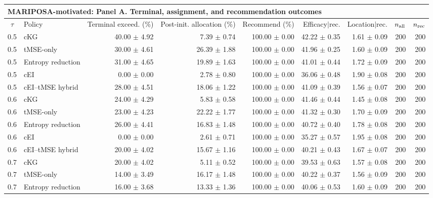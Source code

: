 \bigskip

\begin{tabular}{@{}clrrrrrrr@{}}
\multicolumn{9}{l}{\textbf{MARIPOSA-motivated: Panel A. Terminal, assignment, and recommendation outcomes}} \\
\toprule
$\tau$ & Policy & Terminal exceed. (\%) & Post-init. allocation (\%) & Recommend (\%) & Efficacy$\mid$rec. & Location$\mid$rec. & $n_{\rm all}$ & $n_{\rm rec}$ \\
\midrule
0.5 & cKG & 40.00 $\pm$ 4.92 & 7.39 $\pm$ 0.74 & 100.00 $\pm$ 0.00 & 42.22 $\pm$ 0.35 & 1.61 $\pm$ 0.09 & 200 & 200 \\
0.5 & tMSE-only & 30.00 $\pm$ 4.61 & 26.39 $\pm$ 1.88 & 100.00 $\pm$ 0.00 & 41.96 $\pm$ 0.25 & 1.60 $\pm$ 0.09 & 200 & 200 \\
0.5 & Entropy reduction & 31.00 $\pm$ 4.65 & 19.89 $\pm$ 1.63 & 100.00 $\pm$ 0.00 & 41.01 $\pm$ 0.44 & 1.72 $\pm$ 0.09 & 200 & 200 \\
0.5 & cEI & 0.00 $\pm$ 0.00 & 2.78 $\pm$ 0.80 & 100.00 $\pm$ 0.00 & 36.06 $\pm$ 0.48 & 1.90 $\pm$ 0.08 & 200 & 200 \\
0.5 & cEI--tMSE hybrid & 28.00 $\pm$ 4.51 & 18.06 $\pm$ 1.22 & 100.00 $\pm$ 0.00 & 41.09 $\pm$ 0.39 & 1.56 $\pm$ 0.07 & 200 & 200 \\
0.6 & cKG & 24.00 $\pm$ 4.29 & 5.83 $\pm$ 0.58 & 100.00 $\pm$ 0.00 & 41.46 $\pm$ 0.44 & 1.45 $\pm$ 0.08 & 200 & 200 \\
0.6 & tMSE-only & 23.00 $\pm$ 4.23 & 22.22 $\pm$ 1.77 & 100.00 $\pm$ 0.00 & 41.32 $\pm$ 0.30 & 1.70 $\pm$ 0.09 & 200 & 200 \\
0.6 & Entropy reduction & 26.00 $\pm$ 4.41 & 16.83 $\pm$ 1.48 & 100.00 $\pm$ 0.00 & 40.72 $\pm$ 0.40 & 1.78 $\pm$ 0.08 & 200 & 200 \\
0.6 & cEI & 0.00 $\pm$ 0.00 & 2.61 $\pm$ 0.71 & 100.00 $\pm$ 0.00 & 35.27 $\pm$ 0.57 & 1.95 $\pm$ 0.08 & 200 & 200 \\
0.6 & cEI--tMSE hybrid & 20.00 $\pm$ 4.02 & 15.67 $\pm$ 1.16 & 100.00 $\pm$ 0.00 & 40.21 $\pm$ 0.43 & 1.67 $\pm$ 0.07 & 200 & 200 \\
0.7 & cKG & 20.00 $\pm$ 4.02 & 5.11 $\pm$ 0.52 & 100.00 $\pm$ 0.00 & 39.53 $\pm$ 0.63 & 1.57 $\pm$ 0.08 & 200 & 200 \\
0.7 & tMSE-only & 14.00 $\pm$ 3.49 & 16.17 $\pm$ 1.48 & 100.00 $\pm$ 0.00 & 40.22 $\pm$ 0.37 & 1.56 $\pm$ 0.09 & 200 & 200 \\
0.7 & Entropy reduction & 16.00 $\pm$ 3.68 & 13.33 $\pm$ 1.36 & 100.00 $\pm$ 0.00 & 40.06 $\pm$ 0.53 & 1.60 $\pm$ 0.09 & 200 & 200 \\

\end{tabular}
